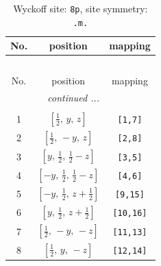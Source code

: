 \documentclass[fleqn,8pt]{jsarticle}
\begin{document}
\begin{longtable}{ccc}
\caption{Wyckoff site: {\tt 8p}, site symmetry: {\tt .m.}}
 \\
 \hline \hline
No. & position & mapping \\ \hline \endfirsthead

\multicolumn{2}{l}{\tablename\ \thetable{}} \\
 \hline \hline
No. & position & mapping \\ \hline \endhead

 \hline \hline
\multicolumn{2}{r}{\footnotesize\it continued ...} \\ \endfoot

 \hline \hline
\multicolumn{2}{r}{} \\ \endlastfoot

1 & $\left[ \frac{1}{2},\, y,\, z \right]$ & {\tt [1,7]} \\ \hline
2 & $\left[ \frac{1}{2},\, - y,\, z \right]$ & {\tt [2,8]} \\ \hline
3 & $\left[ y,\, \frac{1}{2},\, \frac{1}{2} - z \right]$ & {\tt [3,5]} \\ \hline
4 & $\left[ - y,\, \frac{1}{2},\, \frac{1}{2} - z \right]$ & {\tt [4,6]} \\ \hline
5 & $\left[ - y,\, \frac{1}{2},\, z + \frac{1}{2} \right]$ & {\tt [9,15]} \\ \hline
6 & $\left[ y,\, \frac{1}{2},\, z + \frac{1}{2} \right]$ & {\tt [10,16]} \\ \hline
7 & $\left[ \frac{1}{2},\, - y,\, - z \right]$ & {\tt [11,13]} \\ \hline
8 & $\left[ \frac{1}{2},\, y,\, - z \right]$ & {\tt [12,14]} \\
\end{longtable}
\renewcommand{\arraystretch}{1.2}
\end{document}

